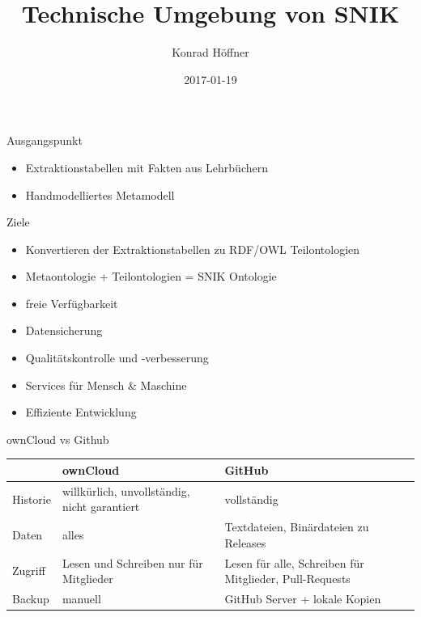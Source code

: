 \documentclass{beamer}
\author{Konrad Höffner}
\date{2017-01-19}
\title{Technische Umgebung von SNIK}
\begin{document}
\begin{frame}
\titlepage
\end{frame}

\begin{frame}{Ausgangspunkt}
\begin{itemize}
\item Extraktionstabellen mit Fakten aus Lehrbüchern 
\item Handmodelliertes Metamodell
\end{itemize}
\end{frame}

\begin{frame}{Ziele}
\begin{itemize}
\item Konvertieren der Extraktionstabellen zu RDF/OWL Teilontologien 
\item Metaontologie + Teilontologien = SNIK Ontologie 
\item freie Verfügbarkeit
\item Datensicherung
\item Qualitätskontrolle und -verbesserung
\item Services für Mensch \& Maschine
\item Effiziente Entwicklung
\end{itemize}
\end{frame}

\begin{frame}{}
\end{frame}

\begin{frame}{}
\end{frame}

\begin{frame}{}
\end{frame}

\iffalse
\begin{frame}{ownCloud vs Github}
\begin{tabulary}{\textwidth}{lLL}
\toprule
			&ownCloud					&GitHub\\
\midrule
Historie		&willkürlich, unvollständig, nicht garantiert	&vollständig\\
Daten			&alles						&Textdateien, Binärdateien zu Releases\\
Zugriff			&Lesen und Schreiben nur für Mitglieder		&Lesen für alle, Schreiben für Mitglieder, Pull-Requests\\
Backup			&manuell					&GitHub Server + lokale Kopien\\
\bottomrule
\end{tabulary}
\end{frame}
\end{document}
